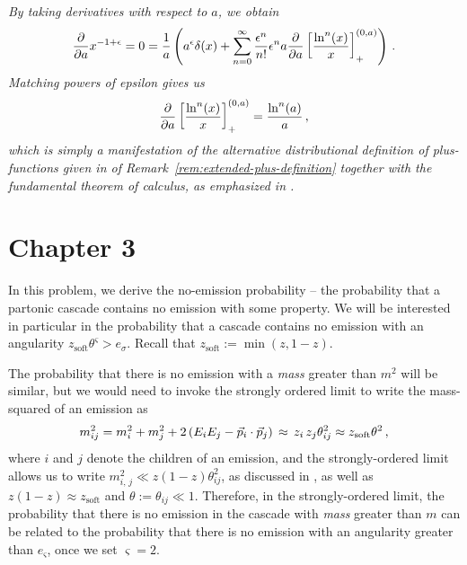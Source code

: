 \begin{remarkbox*}{}{}
\textit{
    By taking derivatives with respect to \(a\), we obtain
    \begin{align}
        \frac{\partial}{\partial a}
        x^{-1 + \epsilon}
        =
        0
        =
        \frac{1}{a}
        \left(
            a^\epsilon \delta(x)
            +
            \sum_{n=0}^\infty
            \frac{\epsilon^n}{n!}
            \epsilon^n
            a
            \frac{\partial}{\partial a}
            \left[\frac{\ln^n(x)}{x}\right]_+^{(0,a)}
        \right)
        \,.
    \end{align}
    Matching powers of epsilon gives us
    \begin{align}
        \frac{\partial}{\partial a}
        \left[\frac{\ln^n(x)}{x}\right]_+^{(0,a)}
        =
        \frac{\ln^n(a)}{a}
        \,,
    \end{align}
    which is simply a manifestation of the alternative distributional definition of plus-functions given in  of Remark~\ref{rem:extended-plus-definition} together with the fundamental theorem of calculus, as emphasized in .
}
\end{remarkbox*}




\section*{Chapter 3}


In this problem, we derive the no-emission probability -- the probability that a partonic cascade contains no emission with some property.
%
We will be interested in particular in the probability that a cascade contains no emission with an angularity \(z_\text{soft} \theta^\varsigma > e_\sigma\).
%
Recall that \(z_\text{soft} := \min(z, 1-z)\).

The probability that there is no emission with a \textit{mass} greater than \(m^2\) will be similar, but we would need to invoke the strongly ordered limit to write the mass-squared of an emission as
\begin{align}
    m^2_{ij}
    =
    m^2_i + m^2_j + 2 \left(E_i E_j - \vec{p}_i \cdot \vec{p}_j\right)
    \,
    \approx
    \,
    z_i\,z_j \theta^2_{ij}
    \approx
    z_\text{soft} \theta^2
    \,,
\end{align}
where \(i\) and \(j\) denote the children of an emission, and the strongly-ordered limit allows us to write \(m^2_{i,\,j} \ll z(1-z)\theta^2_{ij}\), as discussed in , as well as \(z(1-z) \approx z_\text{soft}\) and \(\theta := \theta_{ij} \ll 1\).
%
Therefore, in the strongly-ordered limit, the probability that there is no emission in the cascade with \textit{mass} greater than \(m\) can be related to the probability that there is no emission with an angularity greater than \(e_\varsigma\), once we set \(\varsigma = 2\).



